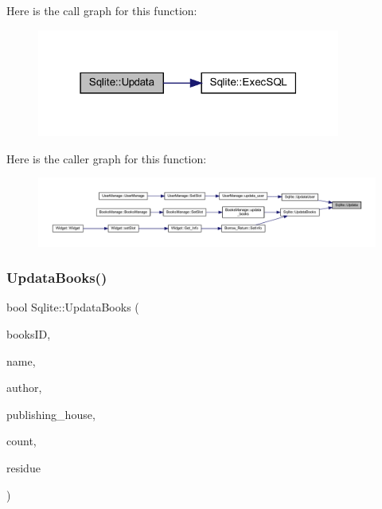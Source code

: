 Here is the call graph for this function\+:
\nopagebreak
\begin{figure}[H]
\begin{center}
\leavevmode
\includegraphics[width=283pt]{class_sqlite_ae014031d1e0b0d9c412fb72ddc5a0043_cgraph}
\end{center}
\end{figure}
Here is the caller graph for this function\+:
\nopagebreak
\begin{figure}[H]
\begin{center}
\leavevmode
\includegraphics[width=350pt]{class_sqlite_ae014031d1e0b0d9c412fb72ddc5a0043_icgraph}
\end{center}
\end{figure}
\mbox{\label{class_sqlite_a233ae80bda6616c5aacbffcc1dd80c8c}} 
\subsubsection{\texorpdfstring{UpdataBooks()}{UpdataBooks()}}
{\footnotesize\ttfamily bool Sqlite\+::\+Updata\+Books (\begin{DoxyParamCaption}\item[{Q\+String}]{books\+ID,  }\item[{Q\+String}]{name,  }\item[{Q\+String}]{author,  }\item[{Q\+String}]{publishing\+\_\+house,  }\item[{int}]{count,  }\item[{int}]{residue }\end{DoxyParamCaption})}


